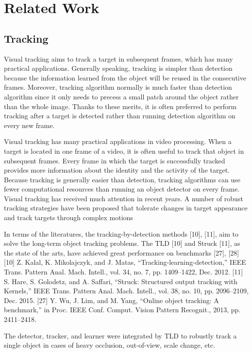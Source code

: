 \documentclass[a4paper]{report}
\begin{document}
\section{Related Work}

\subsection{Tracking}
Visual tracking aims to track a target in subsequent frames, which has many practical applications. Generally speaking, tracking is simpler than detection because the information learned from the object will be reused in the consecutive frames. Moreover, tracking algorithm normally is much faster than detection algorithm since it only needs to precess a small patch around the object rather than the whole image.
Thanks to these merits, it is often preferred to perform tracking after a target is detected rather than running detection algorithm on every new frame.


Visual tracking has many practical applications in video processing. When a target is located in one frame of a video, it is often useful to track that object in subsequent frames. Every frame in which the target is successfully
tracked provides more information about the identity
and the activity of the target. Because tracking is generally easier than detection, tracking algorithms can use fewer computational resources than running an object detector on every frame.
Visual tracking has received much attention in recent years. A number of robust tracking strategies have been proposed that tolerate changes in target appearance and
track targets through complex motions


In terms of the literatures, the tracking-by-detection methods [10], [11], aim to solve the long-term object tracking problems. The TLD [10] and Struck [11], as the state of the arts, have achieved great performance on benchmarks [27], [28]
[10] Z. Kalal, K. Mikolajczyk, and J. Matas, “Tracking-learning-detection,”
IEEE Trans. Pattern Anal. Mach. Intell., vol. 34, no. 7, pp. 1409–1422,
Dec. 2012.
[11] S. Hare, S. Golodetz, and A. Saffari, “Struck: Structured output tracking
with Kernels,” IEEE Trans. Pattern Anal. Mach. Intell., vol. 38, no. 10,
pp. 2096–2109, Dec. 2015.
[27] Y. Wu, J. Lim, and M. Yang, “Online object tracking: A benchmark,” in
Proc. IEEE Conf. Comput. Vision Pattern Recognit., 2013, pp. 2411–2418.

The detector, tracker, and learner were integrated by TLD to robustly track a single object in cases of heavy occlusion, out-of-view, scale change, etc. 
\end{document}
